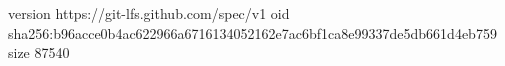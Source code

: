 version https://git-lfs.github.com/spec/v1
oid sha256:b96acce0b4ac622966a6716134052162e7ac6bf1ca8e99337de5db661d4eb759
size 87540
